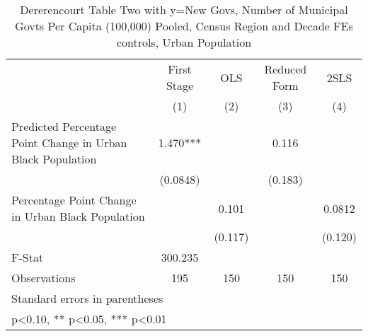 \begin{table}[htbp]\centering
\def\sym#1{\ifmmode^{#1}\else\(^{#1}\)\fi}
\caption{Dererencourt Table Two with y=New Govs, Number of Municipal Govts Per Capita (100,000) Pooled, Census Region and Decade FEs controls, Urban Population}
\begin{tabular}{l*{4}{c}}
\toprule
                    & First Stage   &         OLS   &Reduced Form   &        2SLS   \\
                    &\multicolumn{1}{c}{(1)}   &\multicolumn{1}{c}{(2)}   &\multicolumn{1}{c}{(3)}   &\multicolumn{1}{c}{(4)}   \\
\midrule
Predicted Percentage Point Change in Urban Black Population&       1.470***&               &       0.116   &               \\
                    &    (0.0848)   &               &     (0.183)   &               \\
\addlinespace
Percentage Point Change in Urban Black Population&               &       0.101   &               &      0.0812   \\
                    &               &     (0.117)   &               &     (0.120)   \\
\midrule
F-Stat              &     300.235   &               &               &               \\
Observations        &         195   &         150   &         150   &         150   \\
\bottomrule
\multicolumn{5}{l}{\footnotesize Standard errors in parentheses}\\
\multicolumn{5}{l}{\footnotesize * p<0.10, ** p<0.05, *** p<0.01}\\
\end{tabular}
\end{table}
